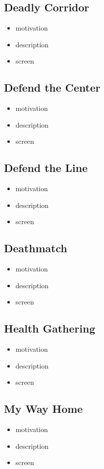 \subsection{Deadly Corridor}
\begin{itemize}
	\item motivation
	\item description
	\item screen
\end{itemize}

\subsection{Defend the Center}
\begin{itemize}
	\item motivation
	\item description
	\item screen
\end{itemize}

\subsection{Defend the Line}
\begin{itemize}
	\item motivation
	\item description
	\item screen
\end{itemize}

\subsection{Deathmatch}
\begin{itemize}
	\item motivation
	\item description
	\item screen
\end{itemize}

\subsection{Health Gathering}
\begin{itemize}
	\item motivation
	\item description
	\item screen
\end{itemize}

\subsection{My Way Home}
\begin{itemize}
	\item motivation
	\item description
	\item screen
\end{itemize}

